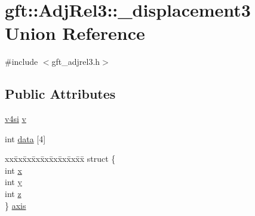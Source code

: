 \hypertarget{uniongft_1_1AdjRel3_1_1__displacement3}{\section{gft\-:\-:Adj\-Rel3\-:\-:\-\_\-displacement3 Union Reference}
\label{uniongft_1_1AdjRel3_1_1__displacement3}
}


{\ttfamily \#include $<$gft\-\_\-adjrel3.\-h$>$}

\subsection*{Public Attributes}
\begin{DoxyCompactItemize}
\item 
\hyperlink{namespacegft_aba3889d81ba015326f093206316745b7}{v4si} \hyperlink{uniongft_1_1AdjRel3_1_1__displacement3_a091c5a31d9f9bd6d2bb83ef162862b24}{v}
\item 
int \hyperlink{uniongft_1_1AdjRel3_1_1__displacement3_a5509be46ba4287a876051921eeff490d}{data} \mbox{[}4\mbox{]}
\item 
\begin{tabbing}
xx\=xx\=xx\=xx\=xx\=xx\=xx\=xx\=xx\=\kill
struct \{\\
\>int \hyperlink{uniongft_1_1AdjRel3_1_1__displacement3_a4fa741e907bc8e74a7cc4286f9db7b19}{x}\\
\>int \hyperlink{uniongft_1_1AdjRel3_1_1__displacement3_a5ebb63d19d067fb232fd980c28a8c465}{y}\\
\>int \hyperlink{uniongft_1_1AdjRel3_1_1__displacement3_ac047739172cb413ef913e594f09170c3}{z}\\
\} \hyperlink{uniongft_1_1AdjRel3_1_1__displacement3_a3aa860b5645b4772e2501cf74396ad08}{axis}\\

\end{tabbing}\end{DoxyCompactItemize}


